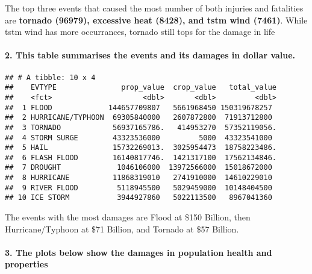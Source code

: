 \documentclass[]{article}
\let\oldparagraph\paragraph
\renewcommand{\paragraph}[1]{\oldparagraph{#1}\mbox{}}
\begin{document}
The top three events that caused the most number of both injuries and
fatalities are \textbf{tornado (96979), excessive heat (8428), and tstm
wind (7461)}. While tstm wind has more occurrances, tornado still tops
for the damage in life

\paragraph{2. This table summarises the events and its damages in dollar
value.}\label{this-table-summarises-the-events-and-its-damages-in-dollar-value.}

\begin{verbatim}
## # A tibble: 10 x 4
##    EVTYPE               prop_value  crop_value   total_value
##    <fct>                     <dbl>       <dbl>         <dbl>
##  1 FLOOD             144657709807   5661968450 150319678257 
##  2 HURRICANE/TYPHOON  69305840000   2607872800  71913712800 
##  3 TORNADO            56937165786.   414953270  57352119056.
##  4 STORM SURGE        43323536000         5000  43323541000 
##  5 HAIL               15732269013.  3025954473  18758223486.
##  6 FLASH FLOOD        16140817746.  1421317100  17562134846.
##  7 DROUGHT             1046106000  13972566000  15018672000 
##  8 HURRICANE          11868319010   2741910000  14610229010 
##  9 RIVER FLOOD         5118945500   5029459000  10148404500 
## 10 ICE STORM           3944927860   5022113500   8967041360
\end{verbatim}

The events with the most damages are Flood at \$150 Billion, then
Hurricane/Typhoon at \$71 Billion, and Tornado at \$57 Billion.

\paragraph{3. The plots below show the damages in population health and
properties}\label{the-plots-below-show-the-damages-in-population-health-and-properties}
\end{document}
